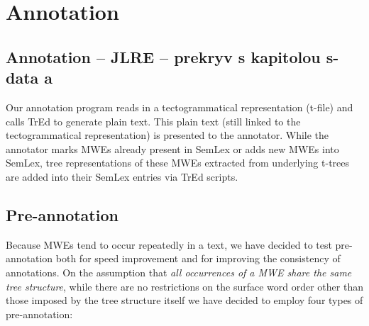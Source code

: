 
\chapter{Annotation}
\label{sec:annot}

\section{Annotation – JLRE -- prekryv s kapitolou s-data a \seman}
\label{sec:annot:jlre}



Our annotation program reads in a tectogrammatical representation (t-file) and calls TrEd \citep{pajas:tred} to generate plain text. This plain text (still linked to the tectogrammatical representation) is presented to the annotator. While the annotator marks MWEs already present in SemLex or adds new MWEs into SemLex, tree representations of these MWEs extracted from underlying t-trees are added into their SemLex entries via TrEd scripts. 



\section{Pre-annotation}
\label{sec:annot:pre}
Because MWEs tend to occur repeatedly in a text, we have decided to test pre-annotation both for speed improvement and for improving the consistency of annotations. 
On the assumption that \emph{all occurrences of a MWE share the same tree structure}, while there are no restrictions on the surface word order other than those imposed by the tree structure itself
%
we have decided to employ four types of pre-annotation:

